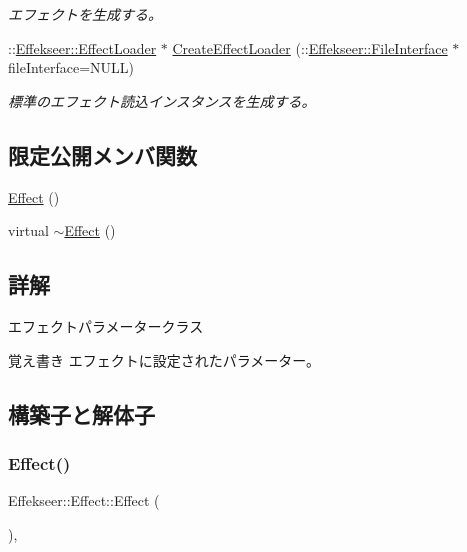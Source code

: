 \begin{DoxyCompactItemize}
\begin{DoxyCompactList}\small\item\em エフェクトを生成する。 \end{DoxyCompactList}\item 
\+::\mbox{\hyperlink{class_effekseer_1_1_effect_loader}{Effekseer\+::\+Effect\+Loader}} $\ast$ \mbox{\hyperlink{class_effekseer_1_1_effect_a462e3f0ea00c20329789521ba47bd2d4}{Create\+Effect\+Loader}} (\+::\mbox{\hyperlink{class_effekseer_1_1_file_interface}{Effekseer\+::\+File\+Interface}} $\ast$file\+Interface=N\+U\+LL)
\begin{DoxyCompactList}\small\item\em 標準のエフェクト読込インスタンスを生成する。 \end{DoxyCompactList}\end{DoxyCompactItemize}
\subsection*{限定公開メンバ関数}
\begin{DoxyCompactItemize}
\item 
\mbox{\hyperlink{class_effekseer_1_1_effect_ac36d4aa804244d12a64ad8e2f9681ed0}{Effect}} ()
\item 
virtual \mbox{\hyperlink{class_effekseer_1_1_effect_aeff1be44efe48d64e2b398d9186c1011}{$\sim$\+Effect}} ()
\end{DoxyCompactItemize}


\subsection{詳解}
エフェクトパラメータークラス 

\begin{DoxyNote}{覚え書き}
エフェクトに設定されたパラメーター。 
\end{DoxyNote}


\subsection{構築子と解体子}
\mbox{\label{class_effekseer_1_1_effect_ac36d4aa804244d12a64ad8e2f9681ed0}} 
\subsubsection{\texorpdfstring{Effect()}{Effect()}}
{\footnotesize\ttfamily Effekseer\+::\+Effect\+::\+Effect (\begin{DoxyParamCaption}{ }\end{DoxyParamCaption})\hspace{0.3cm}{\ttfamily [inline]}, {\ttfamily [protected]}}

